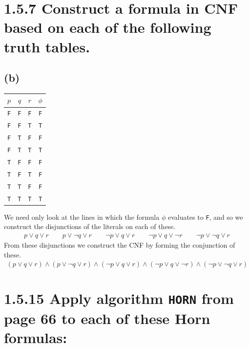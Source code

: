 \documentclass[11pt,a4paper]{article}
\begin{document}
\newpage
\section*{1.5.7 \mdseries Construct a formula in CNF based on each of the following truth tables.}
\subsection*{(b)}
\begin{center}
	\begin{tabu}{ccc|c}
		$p$ & $q$ & $r$ & $\phi$ \\ \hline
		{\tt F} & {\tt F} & {\tt F} & {\tt F} \\
		\rowfont{\color{lightgray}} {\tt F} & {\tt F} & {\tt T} & {\tt T} \\
		{\tt F} & {\tt T} & {\tt F} & {\tt F} \\
		\rowfont{\color{lightgray}} {\tt F} & {\tt T} & {\tt T} & {\tt T} \\
		{\tt T} & {\tt F} & {\tt F} & {\tt F} \\
		{\tt T} & {\tt F} & {\tt T} & {\tt F} \\
		{\tt T} & {\tt T} & {\tt F} & {\tt F} \\
		\rowfont{\color{lightgray}} {\tt T} & {\tt T} & {\tt T} & {\tt T} \\
	\end{tabu}
\end{center}
We need only look at the lines in which the formula $\phi$ evaluates to {\tt F}, and so we construct the disjunctions of the literals on each of these.
\begin{align*}
	p \lor q \lor r \qquad
	p \lor \neg q \lor r \qquad
	\neg p \lor q \lor r \qquad
	\neg p \lor q \lor \neg r \qquad
	\neg p \lor \neg q \lor r
\end{align*}
From these disjunctions we construct the CNF by forming the conjunction of these.
\begin{align*}
	(p \lor q \lor r) \land
	(p \lor \neg q \lor r) \land
	(\neg p \lor q \lor r) \land
	(\neg p \lor q \lor \neg r) \land
	(\neg p \lor \neg q \lor r)
\end{align*}

\section*{1.5.15 \mdseries Apply algorithm {\tt HORN} from page 66 to each of these Horn formulas:}
\end{document}
